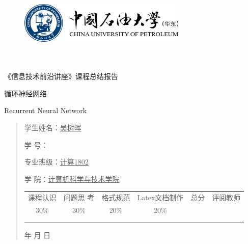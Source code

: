 \documentclass{article}
\renewcommand{\today}{\number\year 年 \number\month 月 \number\day 日}
\begin{document}
\begin{figure}
    \centering
    \includegraphics[width=8cm]{upc.png}

    \label{figupc}
\end{figure}

	\begin{center}
		\quad \\
		\quad \\
		\heiti \fontsize{45}{17} \quad \quad \quad 
		\vskip 1.5cm
		\heiti {} 《信息技术前沿讲座》课程总结报告
		\par 
		循环神经网络
		\par
		Recurrent Neural Network
	\end{center}
	\vskip 1cm
		
	\begin{quotation}
		\doublespacing
		
        \par\setlength\parindent{7em}
		\quad 

		学生姓名：\underline{\qquad  吴树晖 \qquad \qquad}

		学\hspace{0.61cm} 号：\underline{\qquad}
		
		专业班级：\underline{\qquad 计算1802 \qquad  }
		
        学\hspace{0.61cm} 院：\underline{计算机科学与技术学院}
		\vskip 1cm
		\centering
		\begin{table}[h]
            \centering 
            \begin{tabular}{|c|c|c|c|c|c|}
                \hline
                课程认识 & 问题思 考 & 格式规范  & Latex文档制作   & 总分 & 评阅教师 \\
                30\% & 30\% & 20\% & 20\%  &  &  \\
                \hline
                 & & & &  &\\
                & & & &  &\\
                \hline
            \end{tabular}
        \end{table}
		\vskip 2cm
		\today
	\end{quotation}
\end{document}
